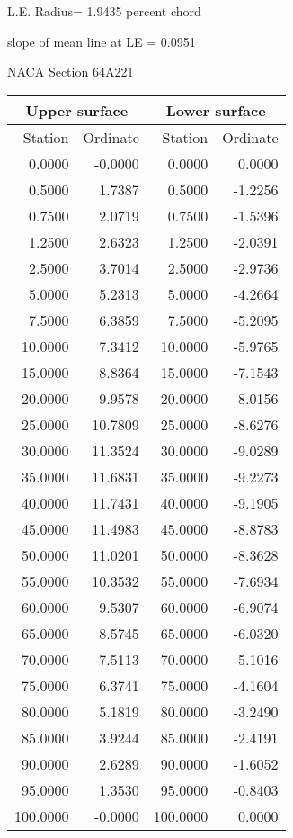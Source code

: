 \documentclass[11pt]{book}
\begin{document}
L.E. Radius=  1.9435 percent chord


 slope of mean line at LE =  0.0951
 \newpage
  \label{s64A221}
 \begin{Large}
 NACA Section 64A221
 \end{Large}
  
 \vspace{8mm}
 \begin{tabular}{|r|r|r|r|} \hline 
 \multicolumn{2}{|c|}{Upper surface} & \multicolumn{2}{|c|}{Lower surface} \\
 \hline
 Station & Ordinate & Station & Ordinate \\
 \hline
0.0000 & -0.0000 & 0.0000 & 0.0000 \\
0.5000 & 1.7387 & 0.5000 & -1.2256 \\
0.7500 & 2.0719 & 0.7500 & -1.5396 \\
1.2500 & 2.6323 & 1.2500 & -2.0391 \\
2.5000 & 3.7014 & 2.5000 & -2.9736 \\
5.0000 & 5.2313 & 5.0000 & -4.2664 \\
7.5000 & 6.3859 & 7.5000 & -5.2095 \\
10.0000 & 7.3412 & 10.0000 & -5.9765 \\
15.0000 & 8.8364 & 15.0000 & -7.1543 \\
20.0000 & 9.9578 & 20.0000 & -8.0156 \\
25.0000 & 10.7809 & 25.0000 & -8.6276 \\
30.0000 & 11.3524 & 30.0000 & -9.0289 \\
35.0000 & 11.6831 & 35.0000 & -9.2273 \\
40.0000 & 11.7431 & 40.0000 & -9.1905 \\
45.0000 & 11.4983 & 45.0000 & -8.8783 \\
50.0000 & 11.0201 & 50.0000 & -8.3628 \\
55.0000 & 10.3532 & 55.0000 & -7.6934 \\
60.0000 & 9.5307 & 60.0000 & -6.9074 \\
65.0000 & 8.5745 & 65.0000 & -6.0320 \\
70.0000 & 7.5113 & 70.0000 & -5.1016 \\
75.0000 & 6.3741 & 75.0000 & -4.1604 \\
80.0000 & 5.1819 & 80.0000 & -3.2490 \\
85.0000 & 3.9244 & 85.0000 & -2.4191 \\
90.0000 & 2.6289 & 90.0000 & -1.6052 \\
95.0000 & 1.3530 & 95.0000 & -0.8403 \\
100.0000 & -0.0000 & 100.0000 & 0.0000 \\
 \hline 
 \end{tabular}
\end{document}

